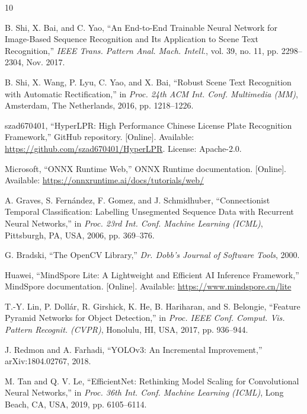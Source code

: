 \documentclass[journal]{IEEEtran}
\begin{document}
\begin{thebibliography}{10}

B. Shi, X. Bai, and C. Yao, ``An End-to-End Trainable Neural Network for
Image-Based Sequence Recognition and Its Application to Scene Text Recognition,''
\emph{IEEE Trans. Pattern Anal. Mach. Intell.}, vol. 39, no. 11,
pp. 2298--2304, Nov. 2017.

B. Shi, X. Wang, P. Lyu, C. Yao, and X. Bai, ``Robust Scene Text Recognition
with Automatic Rectification,'' in \emph{Proc. 24th ACM Int. Conf. Multimedia
(MM)}, Amsterdam, The Netherlands, 2016, pp. 1218--1226.

szad670401, ``HyperLPR: High Performance Chinese License Plate Recognition
Framework,'' GitHub repository. [Online]. Available:
\url{https://github.com/szad670401/HyperLPR}. License: Apache-2.0.

Microsoft, ``ONNX Runtime Web,'' ONNX Runtime documentation. [Online]. Available:
\url{https://onnxruntime.ai/docs/tutorials/web/}

A. Graves, S. Fern\'andez, F. Gomez, and J. Schmidhuber, ``Connectionist Temporal
Classification: Labelling Unsegmented Sequence Data with Recurrent Neural
Networks,'' in \emph{Proc. 23rd Int. Conf. Machine Learning (ICML)}, Pittsburgh,
PA, USA, 2006, pp. 369--376.

G. Bradski, ``The OpenCV Library,'' \emph{Dr. Dobb's Journal of Software Tools},
2000.

Huawei, ``MindSpore Lite: A Lightweight and Efficient AI Inference Framework,''
MindSpore documentation. [Online]. Available:
\url{https://www.mindspore.cn/lite}

T.-Y. Lin, P. Doll\'ar, R. Girshick, K. He, B. Hariharan, and S. Belongie,
``Feature Pyramid Networks for Object Detection,'' in \emph{Proc. IEEE Conf.
Comput. Vis. Pattern Recognit. (CVPR)}, Honolulu, HI, USA, 2017, pp. 936--944.

J. Redmon and A. Farhadi, ``YOLOv3: An Incremental Improvement,''
arXiv:1804.02767, 2018.

M. Tan and Q. V. Le, ``EfficientNet: Rethinking Model Scaling for Convolutional
Neural Networks,'' in \emph{Proc. 36th Int. Conf. Machine Learning (ICML)}, Long
Beach, CA, USA, 2019, pp. 6105--6114.

\end{thebibliography}
\end{document}
